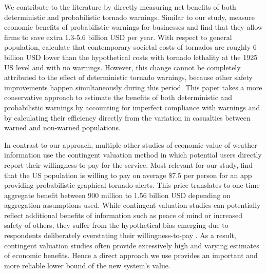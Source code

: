 \documentclass{ametsocV6.1}
\begin{document}
We contribute to the literature by directly measuring net benefits of both deterministic and probabilistic tornado warnings. Similar to our study, \cite{howard_firm_2021} measure economic benefits of probabilistic warnings for businesses and find that they allow firms to save extra 1.3-5.6 billion USD per year. With respect to  general population, \citet{simmons_economic_2013} calculate that contemporary societal costs of tornados are roughly 6 billion USD lower than the hypothetical costs with tornado lethality at the 1925 US level and with no warnings. However, this change cannot be completely attributed to the effect of deterministic tornado warnings, because other safety improvements happen simultaneously during this period. This paper takes a more conservative approach to estimate the benefits of both deterministic and probabilistic warnings by accounting for imperfect compliance with warnings and by calculating their efficiency directly from the variation in casualties between warned and non-warned populations. 

In contrast to our approach, multiple other studies of economic value of weather information \citep{lazo_economic_2002, lazo_300_2009, lazo_valuing_2011, wehde_public_2021-1} use the contingent valuation method in which potential users directly report their willingness-to-pay for the service. Most relevant for our study, \citet{wehde_public_2021-1} find that the US population is willing to pay on average \$7.5 per person for an app providing probabilistic graphical tornado alerts. This price translates to one-time aggregate benefit between 900 million to 1.56 billion USD depending on aggregation assumptions used. While contingent valuation studies can potentially reflect additional benefits of information such as peace of mind or increased safety of others, they suffer from the hypothetical bias emerging due to respondents deliberately overstating their willingness-to-pay \citep{blumenschein_eliciting_2008, johnston_contemporary_2017}.  As a result, contingent valuation studies often provide excessively high and varying estimates of economic benefits. Hence a direct approach we use provides an important and more reliable lower bound of the new system's value. 
\end{document}
